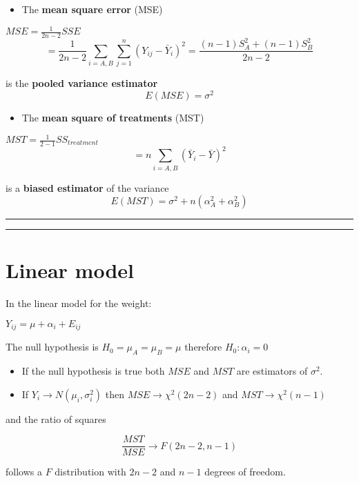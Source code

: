 \documentclass[
]{book}
\providecommand{\tightlist}{%
  \setlength{\itemsep}{0pt}\setlength{\parskip}{0pt}}
\begin{document}
\begin{itemize}
\tightlist
\item
  The \textbf{mean square error} (MSE)
\end{itemize}

\(MSE=\frac{1}{2n-2} SSE\) \[= \frac{1}{2n-2} \sum_{i=A,B}\sum_{j=1}^n(Y_{ij}-\bar{Y}_i)^2= \frac{(n-1)S_A^2+(n-1)S_B^2}{2n-2}\]

is the \textbf{pooled variance estimator} \[E(MSE)=\sigma^2\]

\begin{itemize}
\tightlist
\item
  The \textbf{mean square of treatments} (MST)
\end{itemize}

\(MST=\frac{1}{2-1} SS_{treatment}\) \[ =  n\sum_{i=A,B}(\bar{Y}_{i}-\bar{Y})^2\]

is a \textbf{biased estimator} of the variance \[E(MST)=\sigma^2+n(\alpha_A^2+\alpha_B^2)\]

\begin{center}\rule{0.5\linewidth}{0.5pt}\end{center}

\begin{center}\rule{0.5\linewidth}{0.5pt}\end{center}

\hypertarget{linear-model-2}{%
\section{Linear model}\label{linear-model-2}}

In the linear model for the weight:

\(Y_{ij} = \mu + \alpha_i +E_{ij}\)

The null hypothesis is \(H_0=\mu_A=\mu_B=\mu\) therefore \(H_0:\alpha_i=0\)

\begin{itemize}
\item
  If the null hypothesis is true both \(MSE\) and \(MST\) are estimators of \(\sigma^2\).
\item
  If \(Y_i \rightarrow N(\mu_i, \sigma^2_i)\) then \(MSE \rightarrow \chi^2(2n-2)\) and \(MST \rightarrow \chi^2(n-1)\)
\end{itemize}

and the ratio of squares

\[\frac{MST}{MSE} \rightarrow F(2n-2, n-1)\]

follows a \(F\) distribution with \(2n-2\) and \(n-1\) degrees of freedom.
\end{document}
